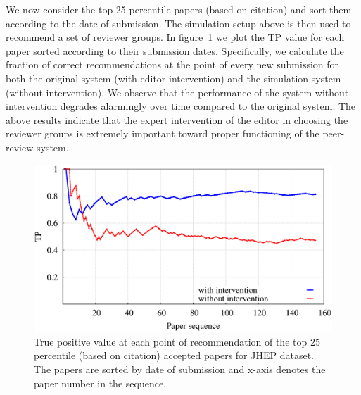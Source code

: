 We now consider the top 25 percentile papers (based on citation) and sort them according to the date of submission. The simulation setup above is then used to recommend a set of reviewer groups. In figure~\ref{fig:ed_imp} we plot the TP value for each paper sorted according to their submission dates. Specifically, we calculate the fraction of correct recommendations at the point of every new submission for both the original system (with editor intervention) and the simulation system (without intervention). We observe that the performance of the system without intervention degrades alarmingly over time compared to the original system. The above results indicate that the expert intervention of the editor in choosing the reviewer groups is extremely important toward proper functioning of the peer-review system. 

\begin{figure}
\centering
\includegraphics[scale = 0.26]{./texfiles/Chapter_4/cikm_17/figures/G_A_comp.eps}
\caption{\label{fig:ed_imp}True positive value at each point of recommendation of the top 25 percentile (based on citation) accepted papers for JHEP dataset. 
The papers are sorted by date of submission and x-axis denotes the paper number in the sequence.}
\vspace{4mm}
\end{figure}
\medskip